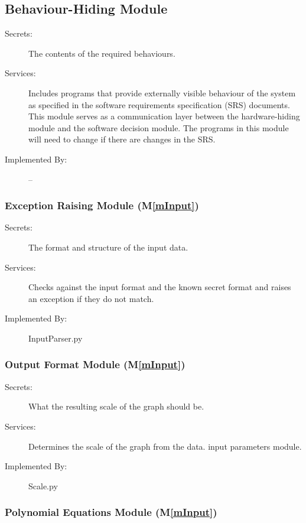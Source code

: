 \documentclass[12pt, titlepage]{article}
\newcommand{\mref}[1]{M\ref{#1}}
\begin{document}
\subsection{Behaviour-Hiding Module}

\begin{description}
\item[Secrets:]The contents of the required behaviours.
\item[Services:]Includes programs that provide externally visible behaviour of
  the system as specified in the software requirements specification (SRS)
  documents. This module serves as a communication layer between the
  hardware-hiding module and the software decision module. The programs in this
  module will need to change if there are changes in the SRS.
\item[Implemented By:] --
\end{description}

\subsubsection{Exception Raising Module (\mref{mInput})}

\begin{description}
\item[Secrets:] The format and structure of the input data.
\item[Services:] Checks against the input format and the known secret format and raises an exception if they do not match.
\item[Implemented By:] InputParser.py
\end{description}

\subsubsection{Output Format Module (\mref{mInput})}

\begin{description}
\item[Secrets:]What the resulting scale of the graph should be. 
\item[Services:]Determines the scale of the graph from the data.
  input parameters module.
\item[Implemented By:] Scale.py
\end{description}

\subsubsection{Polynomial Equations Module (\mref{mInput})}
\end{document}
